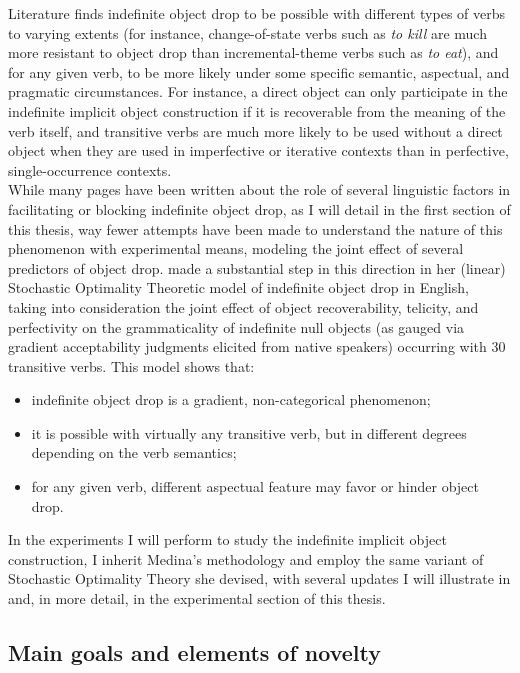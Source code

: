 Literature finds indefinite object drop to be possible with different types of verbs to varying extents (for instance, change-of-state verbs such as \textit{to kill} are much more resistant to object drop than incremental-theme verbs such as \textit{to eat}), and for any given verb, to be more likely under some specific semantic, aspectual, and pragmatic circumstances. For instance, a direct object can only participate in the indefinite implicit object construction if it is recoverable from the meaning of the verb itself, and transitive verbs are much more likely to be used without a direct object when they are used in imperfective or iterative contexts than in perfective, single-occurrence contexts.\\
While many pages have been written about the role of several linguistic factors in facilitating or blocking indefinite object drop, as I will detail in the first section of this thesis, way fewer attempts have been made to understand the nature of this phenomenon with experimental means, modeling the joint effect of several predictors of object drop. \textcite{Medina2007} made a substantial step in this direction in her (linear) Stochastic Optimality Theoretic model of indefinite object drop in English, taking into consideration the joint effect of object recoverability, telicity, and perfectivity on the grammaticality of indefinite null objects (as gauged via gradient acceptability judgments elicited from native speakers) occurring with 30 transitive verbs. This model shows that:
\begin{itemize}
    \item indefinite object drop is a gradient, non-categorical phenomenon;
    \item it is possible with virtually any transitive verb, but in different degrees depending on the verb semantics;
    \item for any given verb, different aspectual feature may favor or hinder object drop.
\end{itemize}

In the experiments I will perform to study the indefinite implicit object construction, I inherit Medina's methodology and employ the same variant of Stochastic Optimality Theory she devised, with several updates I will illustrate in  and, in more detail, in the experimental section of this thesis.


\subsection{Main goals and elements of novelty} 

